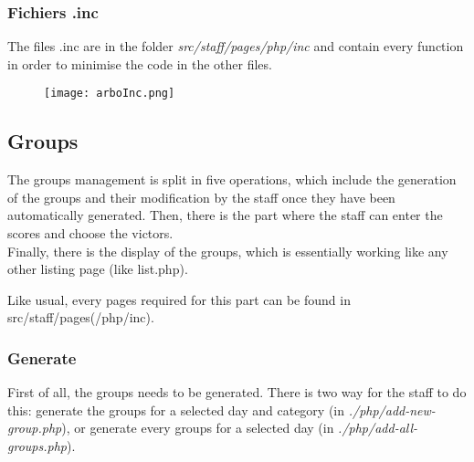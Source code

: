 \documentclass{article}
\begin{document}
\subsubsection{Fichiers .inc}
The files .inc are in the folder \textit{src/staff/pages/php/inc} and contain every function in order to minimise the code in the other files.

\begin{figure}[H]
\centering
\texttt{[image: arboInc.png]}
\caption{}
\end{figure}

\subsection{Groups}
The groups management is split in five operations, which include the generation of the groups and their modification by the staff once they have been automatically generated. Then, there is the part where the staff can enter the scores and choose the victors. \\

Finally, there is the display of the groups, which is essentially working like any other listing page (like list.php).

Like usual, every pages required for this part can be found in
src/staff/pages(/php/inc).

\subsubsection{Generate}
First of all, the groups needs to be generated. There is two way for the staff to do this: generate the groups for a selected day and category (in \textit{./php/add-new-group.php}), or generate every groups for a selected day (in \textit{./php/add-all-groups.php}).
\end{document}
